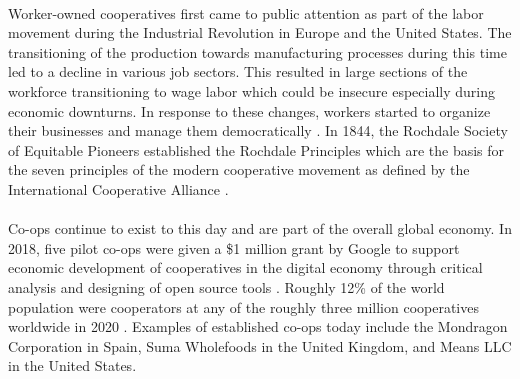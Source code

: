 \paragraph{} Worker-owned cooperatives first came to public attention as part of the labor movement during the Industrial Revolution in Europe and the United States. The transitioning of the production towards manufacturing processes during this time led to a decline in various job sectors. This resulted in large sections of the workforce transitioning to wage labor which could be insecure especially during economic downturns. In response to these changes, workers started to organize their businesses and manage them democratically \autocite{adams_putting_1992}. In 1844, the Rochdale Society of Equitable Pioneers established the Rochdale Principles which are the basis for the seven principles of the modern cooperative movement as defined by the International Cooperative Alliance \autocite{thompson_co-op_1994}.

\paragraph{} Co-ops continue to exist to this day and are part of the overall global economy. In 2018, five pilot co-ops were given a \$1 million grant by Google to support economic development of cooperatives in the digital economy through critical analysis and designing of open source tools \autocite{the_new_school_trebor_2018}. Roughly 12\% of the world population were cooperators at any of the roughly three million cooperatives worldwide in 2020 \autocite{world_cooperative_monitor_exploring_2020}. Examples of established co-ops today include the Mondragon Corporation in Spain, Suma Wholefoods in the United Kingdom, and Means LLC in the United States.

\paragraph{}

